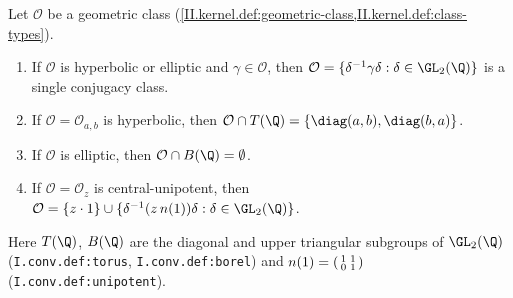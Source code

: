 Let $\mathcal O$ be a geometric class (\cref{II.kernel.def:geometric-class,II.kernel.def:class-types}).
\begin{enumerate}
  \item[(a)] If $\mathcal O$ is hyperbolic or elliptic and $\gamma\in\mathcal O$, then $\mathcal O=\{\delta^{-1}\gamma\delta:\delta\in\GL_2(\Q)\}$ is a single conjugacy class.
  \item[(b)] If $\mathcal O=\mathcal O_{a,b}$ is hyperbolic, then $\mathcal O\cap T(\Q)=\{\diag(a,b),\diag(b,a)\}$.
  \item[(c)] If $\mathcal O$ is elliptic, then $\mathcal O\cap B(\Q)=\emptyset$.
  \item[(d)] If $\mathcal O=\mathcal O_z$ is central-unipotent, then $\mathcal O=\{z\cdot1\}\cup\{\delta^{-1}(z\,n(1))\delta:\delta\in\GL_2(\Q)\}$.
\end{enumerate}
Here $T(\Q)$, $B(\Q)$ are the diagonal and upper triangular subgroups of $\GL_2(\Q)$ (\texttt{I.conv.def:torus}, \texttt{I.conv.def:borel}) and
$n(1)=\begin{psmallmatrix}1&1\\0&1\end{psmallmatrix}$ (\texttt{I.conv.def:unipotent}).

